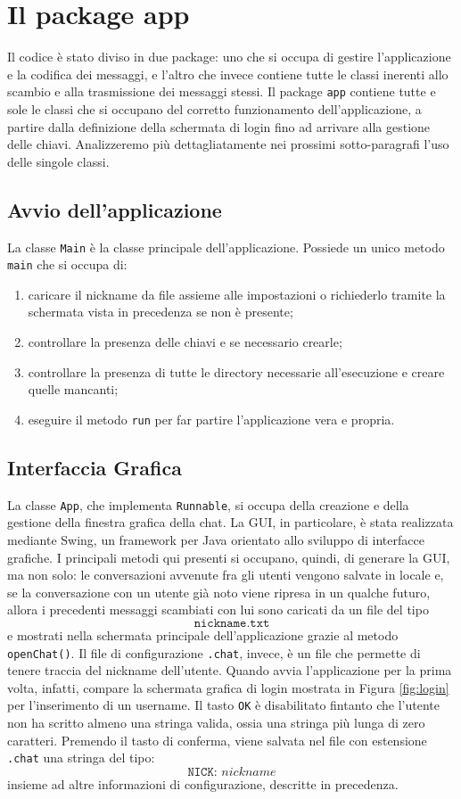 \section{Il package app}
Il codice è stato diviso in due package: uno che si occupa di gestire l'applicazione
e la codifica dei messaggi, e l'altro che invece contiene tutte le classi inerenti
allo scambio e alla trasmissione dei messaggi stessi.
Il package \texttt{app} contiene tutte e sole le classi che si occupano del corretto
funzionamento dell'applicazione, a partire dalla definizione della schermata di login
fino ad arrivare alla gestione delle chiavi. Analizzeremo più dettagliatamente
nei prossimi sotto-paragrafi l'uso delle singole classi.

\subsection{Avvio dell'applicazione}
La classe \texttt{Main} è la classe principale dell'applicazione.
Possiede un unico metodo \texttt{main} che
si occupa di:
\begin{enumerate}
	\item caricare il nickname da file assieme alle impostazioni o richiederlo tramite la
	schermata vista in precedenza se non è presente;
	\item controllare la presenza delle chiavi e se necessario crearle;
	\item controllare la presenza di tutte le directory necessarie all'esecuzione e creare 
	quelle mancanti;
	\item eseguire il metodo \texttt{run} per far partire l'applicazione vera e propria.
\end{enumerate}

\subsection{Interfaccia Grafica}
La classe \texttt{App}, che implementa \texttt{Runnable}, si occupa della
creazione e della gestione della finestra grafica della chat. La GUI,
in particolare, è stata realizzata mediante Swing, un framework per Java
orientato allo sviluppo di interfacce grafiche.
I principali metodi qui presenti si occupano, quindi, di generare la GUI, ma non
solo: le conversazioni avvenute fra gli utenti vengono salvate in locale e, se
la conversazione con un utente già noto viene ripresa in un qualche futuro, allora
i precedenti messaggi scambiati con lui sono caricati da un file del tipo
$$ \texttt{nickname.txt} $$ 
e mostrati nella schermata principale dell'applicazione grazie al metodo \texttt{openChat()}.
Il file di configurazione \texttt{.chat}, invece, è un file che permette di
tenere traccia del nickname dell'utente. Quando avvia l'applicazione per la
prima volta, infatti, compare la schermata grafica di login mostrata in Figura \ref{fig:login} 
per l'inserimento di un username.
Il tasto \texttt{OK} è disabilitato fintanto che l'utente non ha
scritto almeno una stringa valida, ossia una stringa più lunga di zero caratteri.
Premendo il tasto di conferma, viene salvata nel file con estensione \texttt{.chat}
una stringa del tipo:
$$ \texttt{NICK: $nickname$} $$
insieme ad altre informazioni di configurazione, descritte in precedenza.

